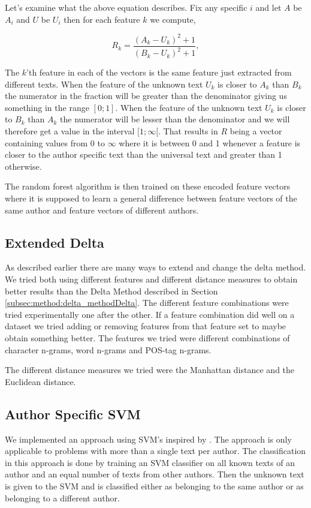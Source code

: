 Let's examine what the above equation describes. Fix any specific $i$ and let
$A$ be $A_i$ and $U$ be $U_i$ then for each feature $k$ we compute,

\begin{equation}
\label{eq:rf-encode}
    R_k = \frac{(A_k-U_k)^2+1}{(B_k-U_k)^2+1},
\end{equation}

The $k$'th feature in each of the vectors is the same feature just extracted
from different texts. When the feature of the unknown text $U_k$ is closer to
$A_k$ than $B_k$ the numerator in the fraction will be greater than the
denominator giving us something in the range $[0; 1]$. When the feature of the
unknown text $U_k$ is closer to $B_k$ than $A_k$ the numerator will be lesser
than the denominator and we will therefore get a value in the interval
$[1; \infty[$. That results in $R$ being a vector containing values from 0 to
$\infty$ where it is between 0 and 1 whenever a feature is closer to the author
specific text than the universal text and greater than 1 otherwise.

The random forest algorithm is then trained on these encoded feature vectors
where it is supposed to learn a general difference between feature vectors of
the same author and feature vectors of different authors.

\subsection{Extended Delta} \label{subsec:method:extended_delta} As
described earlier there are many ways to extend and change the delta
method. We tried both using different features and different distance
measures to obtain better results than the Delta Method described in Section
\ref{subsec:method:delta_methodDelta}. The different feature combinations were
tried experimentally one after the other. If a feature combination did well on
a dataset we tried adding or removing features from that feature set to maybe
obtain something better. The features we tried were different combinations of
character n-grams, word n-grams and \gls{POS}-tag n-grams.

The different distance measures we tried were the Manhattan distance and the
Euclidean distance.


\subsection{Author Specific SVM} \label{subsec:method:author_specific_svm}
We implemented an approach using \gls{SVM}'s inspired by \cite{hansen2014}. The
approach is only applicable to problems with more than a single text per author.
The classification in this approach is done by training an \gls{SVM} classifier
on all known texts of an author and an equal number of texts from other authors.
Then the unknown text is given to the \gls{SVM} and is classified either as
belonging to the same author or as belonging to a different author.

